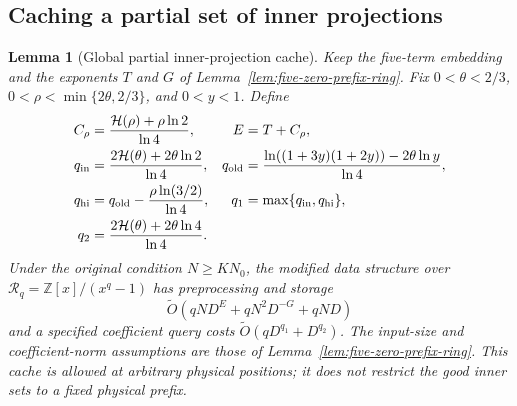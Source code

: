 \documentclass[11pt]{article}
\newtheorem{lemma}[theorem]{Lemma}
\newcommand{\softO}{\widetilde O}
\newcommand{\HH}{\mathcal H}
\begin{document}
\subsection*{Caching a partial set of inner projections}

\begin{lemma}[Global partial inner-projection cache]
\label{lem:five-partial-cache}
Keep the five-term embedding and the exponents $T$ and $G$ of
Lemma~\ref{lem:five-zero-prefix-ring}. Fix
$0<\theta<2/3$, $0<\rho<\min\{2\theta,2/3\}$, and $0<y<1$.
Define
\begin{align*}
 C_\rho&=\frac{\HH(\rho)+\rho\ln2}{\ln4},& E&=T+C_\rho,\\
 q_{\rm in}&=\frac{2\HH(\theta)+2\theta\ln2}{\ln4},&
 q_{\rm old}&=\frac{\ln((1+3y)(1+2y))-2\theta\ln y}{\ln4},\\
 q_{\rm hi}&=q_{\rm old}-\frac{\rho\ln(3/2)}{\ln4},&
 q_1&=\max\{q_{\rm in},q_{\rm hi}\},\\
 q_2&=\frac{2\HH(\theta)+2\theta\ln4}{\ln4}.
\end{align*}
Under the original condition $N\ge KN_0$, the modified data structure
over $\mathcal R_q=\mathbb Z[x]/(x^q-1)$ has preprocessing and storage
\[
 \softO\left(qND^E+qN^2D^{-G}+qND\right)
\]
and a specified coefficient query costs
$\softO(qD^{q_1}+D^{q_2})$. The input-size and coefficient-norm assumptions
are those of Lemma~\ref{lem:five-zero-prefix-ring}. This cache is allowed
at arbitrary physical positions; it does not restrict the good inner
sets to a fixed physical prefix.
\end{lemma}
\end{document}
